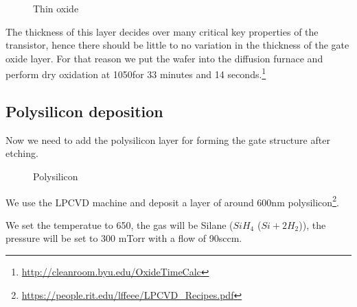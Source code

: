 \begin{figure}[H]
	\centering
	\begin{tikzpicture}[node distance = 3cm, auto, thick,scale=\CrossSectionOnly, every node/.style={transform shape}]
		
	\end{tikzpicture}
	\begin{tikzpicture}[node distance = 3cm, auto, thick,scale=\CrossSectionOnly, every node/.style={transform shape}]
		
	\end{tikzpicture}
	\caption{Thin oxide}
\end{figure}
The thickness of this layer decides over many critical key properties of the transistor, hence there should be little to no variation in the thickness of the gate oxide layer.
For that reason we put the wafer into the diffusion furnace and perform dry oxidation at 1050\degreesC for 33 minutes and 14 seconds.\footnote{\url{http://cleanroom.byu.edu/OxideTimeCalc}}

\subsection{Polysilicon deposition}\label{step_depositing_poly}

Now we need to add the polysilicon layer for forming the gate structure after etching.

\begin{figure}[H]
	\centering
	\begin{tikzpicture}[node distance = 3cm, auto, thick,scale=\CrossSectionOnly, every node/.style={transform shape}]
		
	\end{tikzpicture}
	\drawStepArrow{}
	\begin{tikzpicture}[node distance = 3cm, auto, thick,scale=\CrossSectionOnly, every node/.style={transform shape}]
		
	\end{tikzpicture}
	\caption{Polysilicon}
\end{figure}

We use the LPCVD machine and deposit a layer of around 600nm polysilicon\footnote{\url{https://people.rit.edu/lffeee/LPCVD_Recipes.pdf}}.

We set the temperatue to 650\degreesC, the gas will be Silane ($Si H_4$ ($Si + 2H_2$)), the pressure will be set to 300 mTorr with a flow of 90sccm.

